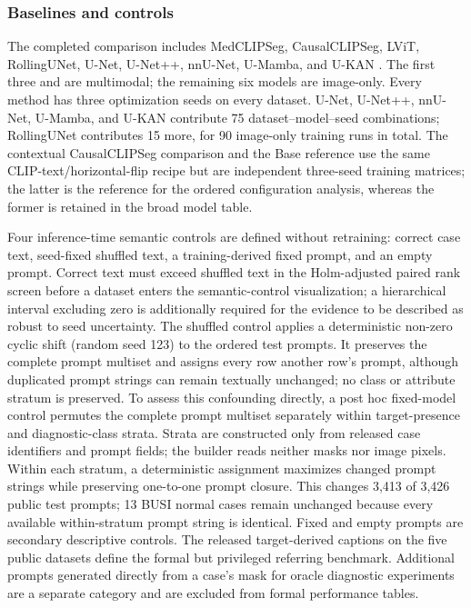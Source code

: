 \subsubsection{Baselines and controls}
The completed comparison includes MedCLIPSeg, CausalCLIPSeg, LViT, RollingUNet,
U-Net, U-Net++, nnU-Net, U-Mamba, and U-KAN
\cite{medclipseg,causalclipseg,lvit,rollingunet,unet,unetpp,nnunet,umamba,ukan}.
The first three and \methodname{} are multimodal; the remaining six models are
image-only. Every method has three optimization seeds on every dataset. U-Net,
U-Net++, nnU-Net, U-Mamba, and U-KAN contribute 75
dataset--model--seed combinations; RollingUNet contributes 15 more, for 90
image-only training runs in total. The contextual CausalCLIPSeg comparison and
the Base reference use the same CLIP-text/horizontal-flip recipe but are
independent three-seed training matrices; the latter is the reference for the
ordered configuration analysis, whereas the former is retained in the broad
model table.

Four inference-time semantic controls are defined without retraining: correct
case text, seed-fixed shuffled text,
a training-derived fixed prompt, and an empty prompt. Correct text must exceed
shuffled text in the Holm-adjusted paired rank screen before a dataset enters
the semantic-control visualization; a hierarchical interval excluding zero is
additionally required for the evidence to be described as robust to seed
uncertainty. The shuffled control applies a deterministic non-zero cyclic shift
(random seed 123) to the ordered test prompts. It preserves the complete prompt
multiset and assigns every row another row's prompt, although duplicated prompt
strings can remain textually unchanged; no class or attribute stratum is
preserved. To assess this confounding directly, a post hoc fixed-model
control permutes the complete prompt multiset separately within target-presence
and diagnostic-class strata. Strata are constructed only from released case
identifiers and prompt fields; the builder reads neither masks nor image pixels.
Within each stratum, a deterministic assignment maximizes changed prompt strings
while preserving one-to-one prompt closure. This changes 3,413 of 3,426 public
test prompts; 13 BUSI normal cases remain unchanged because every available
within-stratum prompt string is identical. Fixed and empty prompts are secondary
descriptive controls. The released target-derived captions on the
five public datasets define the formal but privileged referring benchmark.
Additional prompts generated directly from a case's mask for oracle diagnostic
experiments are a separate category and are excluded from formal performance
tables.

